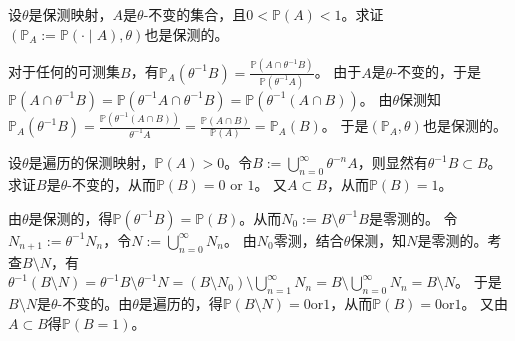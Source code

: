 \documentclass{ctexart}
\newif\ifpreface
\begin{document}
\large
\setlength{\baselineskip}{1.2em}
\ifpreface

\newgeometry{left=2cm,right=2cm,top=2cm,bottom=2cm}
\else
{}
\maketitle
\fi
\begin{problem}\label{pro:1}
  设\(\theta \)是保测映射，\(A \)是\(\theta \)-不变的集合，且\(0<\mathbb{P}(A)<1 \)。求证\((\mathbb{P}_A:=\mathbb{P}(\cdot \mid A),\theta)\)也是保测的。
\end{problem}
\begin{solution}
  对于任何的可测集\(B \)，有\(\mathbb{P}_A(\theta^{-1} B)=\frac{\mathbb{P}(A \cap \theta^{-1} B)}{\mathbb{P}(\theta^{-1} A)} \)。
  由于\(A \)是\(\theta \)-不变的，于是\(\mathbb{P}(A \cap \theta^{-1} B) = \mathbb{P}(\theta^{-1} A \cap \theta^{-1} B) = \mathbb{P}(\theta^{-1} (A \cap B)) \)。
  由\(\theta\)保测知\(\mathbb{P}_A(\theta^{-1}B)=\frac{\mathbb{P}(\theta^{-1}(A \cap B))}{\theta ^{-1} A}=\frac{\mathbb{P}(A \cap B)}{\mathbb{P}(A)}=\mathbb{P}_A(B) \)。
  于是\((\mathbb{P}_A,\theta ) \)也是保测的。
\end{solution}
\begin{problem}\label{pro:2}
  设\(\theta \)是遍历的保测映射，\(\mathbb{P}(A)>0 \)。令\(B:=\bigcup_{n=0}^{\infty}\theta^{-n}A \)，则显然有\(\theta ^{-1} B \subset B \)。
  求证\(B \)是\(\theta \)-不变的，从而\(\mathbb{P}(B)=0 \text{ or } 1 \)。
  又\(A \subset B \)，从而\(\mathbb{P}(B)=1 \)。
\end{problem}
\begin{solution}
  由\(\theta \)是保测的，得\(\mathbb{P}(\theta ^{-1} B)=\mathbb{P}(B) \)。从而\(N_{0}:=B \setminus \theta ^{-1} B \)是零测的。
  令\(N_{n+1} := \theta ^{-1} N_n \)，令\(N:=\bigcup_{n=0}^{\infty}N_n \)。
  由\(N_{0} \)零测，结合\(\theta \)保测，知\(N \)是零测的。考查\(B \setminus N \)，有
  \(\theta ^{-1}(B \setminus N) = \theta ^{-1} B \setminus \theta ^{-1} N = (B \setminus N_{0}) \setminus \bigcup_{n=1}^{\infty}N_n = B\setminus \bigcup_{n=0}^{\infty}N_n =B \setminus N\)。
  于是\(B\setminus N \)是\(\theta \)-不变的。由\(\theta \)是遍历的，得\(\mathbb{P}(B \setminus N)=0 \text{or} 1 \)，从而\(\mathbb{P}(B)=0 \text{or} 1 \)。
  又由\(A \subset B \)得\(\mathbb{P}(B=1) \)。
\end{solution}
\end{document}
